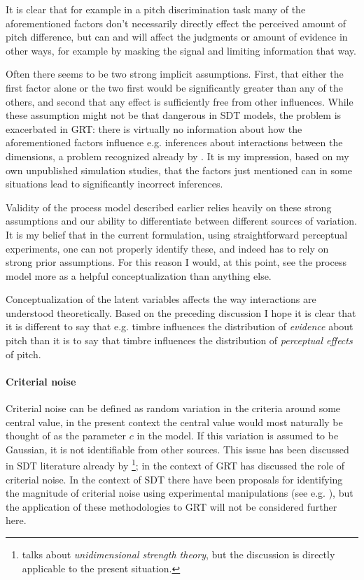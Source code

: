 \documentclass{article}\usepackage{knitr}
\begin{document}
It is clear that for example in a pitch discrimination task many of the aforementioned factors don't necessarily directly effect the perceived amount of pitch difference, but can and will affect the judgments or amount of evidence in other ways, for example by masking the signal and limiting information that way.

Often there seems to be two strong implicit assumptions. First, that either the first factor alone or the two first would be significantly greater than any of the others, and second that any effect is sufficiently free from other influences. While these assumption might not be that dangerous in SDT models, the problem is exacerbated in GRT: there is virtually no information about how the aforementioned factors influence e.g. inferences about interactions between the dimensions, a problem recognized already by \citet{silbert2009}. It is my impression, based on my own unpublished simulation studies, that the factors just mentioned can in some situations lead to significantly incorrect inferences. 

Validity of the process model described earlier relies heavily on these strong assumptions and our ability to differentiate between different sources of variation. It is my belief that in the current formulation, using straightforward perceptual experiments, one can not properly identify these, and indeed has to rely on strong prior assumptions. For this reason I would, at this point, see the process model more as a helpful conceptualization than anything else.

Conceptualization of the latent variables affects the way interactions are understood theoretically. Based on the preceding discussion I hope it is clear that it is different to say that e.g. timbre influences the distribution of \textit{evidence} about pitch than it is to say that timbre influences the distribution of \textit{perceptual effects} of pitch.

\paragraph{Criterial noise}

Criterial noise can be defined as random variation in the criteria around some central value, in the present context the central value would most naturally be thought of as the parameter $c$ in the model. If this variation is assumed to be Gaussian, it is not identifiable from other sources. This issue has been discussed in SDT literature already by \cite{wickelgren1968}\footnote{\cite{wickelgren1968} talks about \textit{unidimensional strength theory}, but the discussion is directly applicable to the present situation.}; in the context of GRT \citet{ashby2000} has discussed the role of criterial noise. In the context of SDT there have been proposals for identifying the magnitude of criterial noise using experimental manipulations (see e.g. \citealt{kellen2012, benjamin2009, cabrera2015}), but the application of these methodologies to GRT will not be considered further here. 
\end{document}
